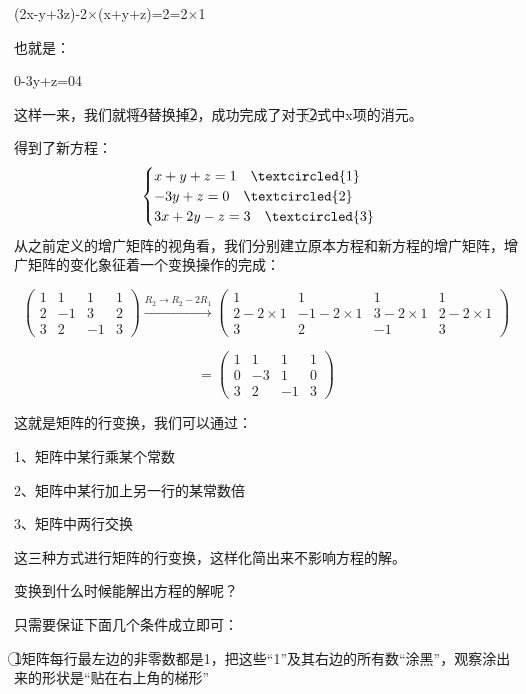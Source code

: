 \documentclass[12pt,a4paper]{book}
\begin{document}
\begin{center}
\centering (2x-y+3z)-2$\times$(x+y+z)=2=2$\times$1
\end{center}

也就是：
\begin{center}
0-3y+z=0\textcircled{4}
\end{center}

这样一来，我们就将\textcircled{4}替换掉\textcircled{2}，成功完成了对于\textcircled{2}式中x项的消元。

得到了新方程：
\[
\begin{cases}
x + y + z = 1    \quad\textcircled{1}\\
- 3y + z = 0  \quad\textcircled{2}\\
3x + 2y - z = 3  \quad\textcircled{3}
\end{cases}
\]
从之前定义的增广矩阵的视角看，我们分别建立原本方程和新方程的增广矩阵，增广矩阵的变化象征着一个变换操作的完成：



\[
\begin{pmatrix}
1 & 1 & 1 & 1\\
2 & -1 & 3 & 2\\
3 & 2 & -1 & 3
\end{pmatrix}
\xrightarrow{R_2\rightarrow R_2 - 2R_1}\begin{pmatrix}
1 & 1 & 1 & 1\\
2 - 2\times1 & -1 - 2\times1 & 3 - 2\times1 & 2 - 2\times1\\
3 & 2 & -1 & 3
\end{pmatrix}
\]

\[
=
\begin{pmatrix}
1 & 1 & 1 & 1\\
0 & -3 & 1 & 0\\
3 & 2 & -1 & 3
\end{pmatrix}
\]

这就是矩阵的行变换，我们可以通过：

1、矩阵中某行乘某个常数

2、矩阵中某行加上另一行的某常数倍

3、矩阵中两行交换

这三种方式进行矩阵的行变换，这样化简出来不影响方程的解。

\vspace{10pt}
变换到什么时候能解出方程的解呢？

只需要保证下面几个条件成立即可：

\textcircled{1}矩阵每行最左边的非零数都是1，把这些“1”及其右边的所有数“涂黑”，观察涂出来的形状是“贴在右上角的梯形”
\end{document}
